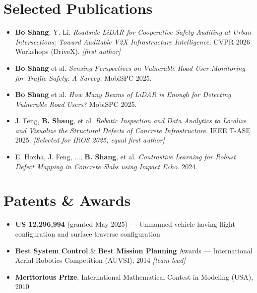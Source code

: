 \documentclass[letterpaper,10pt]{article}
\newcommand{\resumeBullet}[1]{
  \item\small{#1 \vspace{-2pt}}
}
\newcommand{\resumeSubHeadingListStart}{\begin{itemize}[leftmargin=*]}
\newcommand{\resumeSubHeadingListEnd}{\end{itemize}}
\begin{document}
\section{Selected Publications}
  \resumeSubHeadingListStart
    \resumeBullet{\textbf{Bo Shang}, Y. Li. \textit{Roadside LiDAR for Cooperative Safety Auditing at Urban Intersections: Toward Auditable V2X Infrastructure Intelligence.} CVPR 2026 Workshops (DriveX). \textit{[first author]}}
    \resumeBullet{\textbf{Bo Shang} et al. \textit{Sensing Perspectives on Vulnerable Road User Monitoring for Traffic Safety: A Survey.} MobiSPC 2025.}
    \resumeBullet{\textbf{Bo Shang} et al. \textit{How Many Beams of LiDAR is Enough for Detecting Vulnerable Road Users?} MobiSPC 2025.}
    \resumeBullet{J. Feng, \textbf{B. Shang}, et al. \textit{Robotic Inspection and Data Analytics to Localize and Visualize the Structural Defects of Concrete Infrastructure.} IEEE T-ASE 2025. \textit{[Selected for IROS 2025; equal first author]}}
    \resumeBullet{E. Hoxha, J. Feng, $\ldots$, \textbf{B. Shang}, et al. \textit{Contrastive Learning for Robust Defect Mapping in Concrete Slabs using Impact Echo.} 2024.}
  \resumeSubHeadingListEnd

\section{Patents \& Awards}
  \resumeSubHeadingListStart
    \resumeBullet{\textbf{US 12,296,994} (granted May 2025) --- Unmanned vehicle having flight configuration and surface traverse configuration}
    \resumeBullet{\textbf{Best System Control} \& \textbf{Best Mission Planning} Awards --- International Aerial Robotics Competition (AUVSI), 2014 \textit{[team lead]}}
    \resumeBullet{\textbf{Meritorious Prize}, International Mathematical Contest in Modeling (USA), 2010}
  \resumeSubHeadingListEnd
\end{document}
